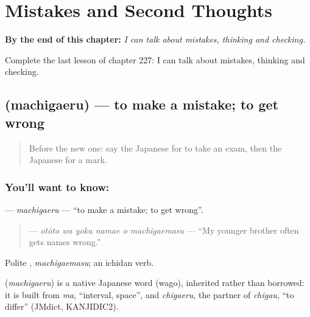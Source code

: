 
\chapter{Mistakes and Second Thoughts}
\label{ch:ja-mistakes-and-second-thoughts}

\begin{chapteropening}
\textbf{By the end of this chapter:} \emph{I can talk about mistakes, thinking and checking.}

Complete the last lesson of chapter 227: I can talk about mistakes, thinking and checking.
\end{chapteropening}

\section[\texorpdfstring{\ja{まちがえる} (machigaeru)}{まちがえる (machigaeru)}]{ (machigaeru) — to make a mistake; to get wrong}

\label{lesson:JA-C227-machigaeru}



\begin{quote}
Before the new one: say the Japanese for to take an exam, then the Japanese for a mark.
\end{quote}

\subsection*{You'll want to know: }
\textbf{} — \emph{machigaeru} — \textquotedblleft{}to make a mistake; to get wrong\textquotedblright{}.

\begin{quote}
\textbf{   } — \emph{otōto wa yoku namae o machigaemasu} — \textquotedblleft{}My younger brother often gets names wrong.\textquotedblright{}
\end{quote}

Polite \textbf{}, \emph{machigaemasu}; an ichidan verb.

\begin{cousinweb}
\textbf{} (\emph{machigaeru}) is a native Japanese word (wago), inherited rather than borrowed: it is built from \emph{ma}, \textquotedblleft{}interval, space\textquotedblright{}, and \emph{chigaeru}, the partner of \emph{chigau}, \textquotedblleft{}to differ\textquotedblright{} (JMdict, KANJIDIC2).
\end{cousinweb}

